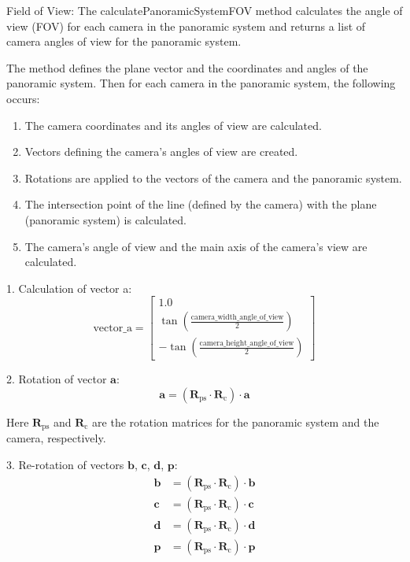 Field of View: The calculatePanoramicSystemFOV method calculates the angle of view (FOV) for each camera in the panoramic system and returns a list of camera angles of view for the panoramic system.

The method defines the plane vector and the coordinates and angles of the panoramic system. Then for each camera in the panoramic system, the following occurs:

\begin{enumerate}
    \item The camera coordinates and its angles of view are calculated.
    \item Vectors defining the camera's angles of view are created.
    \item Rotations are applied to the vectors of the camera and the panoramic system.
    \item The intersection point of the line (defined by the camera) with the plane (panoramic system) is calculated.
    \item The camera's angle of view and the main axis of the camera's view are calculated.
\end{enumerate}


1. Calculation of vector a:
$$
\text{vector\_a} = \begin{bmatrix}
1.0 \\
\tan\left(\frac{\text{camera\_width\_angle\_of\_view}}{2}\right) \\
-\tan\left(\frac{\text{camera\_height\_angle\_of\_view}}{2}\right)
\end{bmatrix}
$$

2. Rotation of vector $ \mathbf{a} $:
$$
\mathbf{a} = \left(\mathbf{R}_\text{ps} \cdot \mathbf{R}_\text{c}\right) \cdot \mathbf{a}
$$

Here $ \mathbf{R}_\text{ps} $ and $ \mathbf{R}_\text{c} $ are the rotation matrices for the panoramic system and the camera, respectively.

3. Re-rotation of vectors $ \mathbf{b} $, $ \mathbf{c} $, $ \mathbf{d} $, $ \mathbf{p} $:
\begin{align*}
\mathbf{b} &= \left(\mathbf{R}_\text{ps} \cdot \mathbf{R}_\text{c}\right) \cdot \mathbf{b} \\
\mathbf{c} &= \left(\mathbf{R}_\text{ps} \cdot \mathbf{R}_\text{c}\right) \cdot \mathbf{c} \\
\mathbf{d} &= \left(\mathbf{R}_\text{ps} \cdot \mathbf{R}_\text{c}\right) \cdot \mathbf{d} \\
\mathbf{p} &= \left(\mathbf{R}_\text{ps} \cdot \mathbf{R}_\text{c}\right) \cdot \mathbf{p} 
\end{align*}

